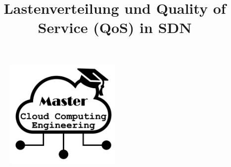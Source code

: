 \title{Lastenverteilung und Quality of Service (QoS) in SDN}

\begin{figure}
    \centering
    \includegraphics[width=0.5\textwidth]{fig/Fig1.png}
    \label{fig:title-image}
\end{figure}
